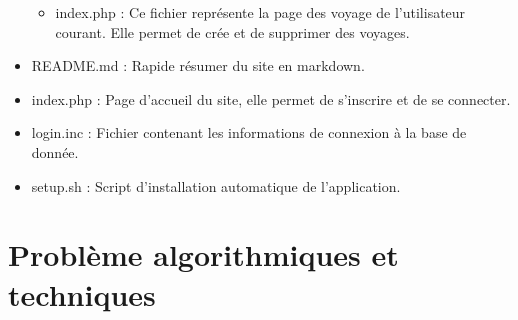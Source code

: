 \documentclass[a4paper,10pt]{report}
\begin{document}
\begin{itemize}
\begin{itemize}
        \item index.php : Ce fichier repr\'esente la page des voyage de l'utilisateur courant. Elle permet de cr\'ee et de supprimer des voyages.
    \end{itemize}
    \item README.md : Rapide r\'esumer du site en markdown.
    \item index.php : Page d'accueil du site, elle permet de s'inscrire et de se connecter.
    \item login.inc : Fichier contenant les informations de connexion à la base de donn\'ee.
    \item setup.sh : Script d'installation automatique de l'application.
\end{itemize}


\section{Probl\`eme algorithmiques et techniques}
\end{document}
